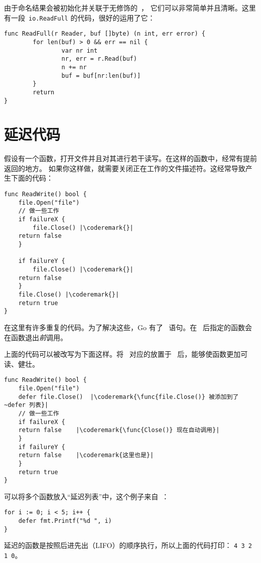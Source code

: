 由于命名结果会被初始化并关联于无修饰的~，
它们可以非常简单并且清晰。这里有一段~\lstinline{io.ReadFull} 的代码，很好的运用了它：

\begin{lstlisting}
func ReadFull(r Reader, buf []byte) (n int, err error) {
        for len(buf) > 0 && err == nil {
                var nr int
                nr, err = r.Read(buf)
                n += nr
                buf = buf[nr:len(buf)]
        }
        return
}
\end{lstlisting}

\section{延迟代码}
\label{sec:deferred code}
假设有一个函数，打开文件并且对其进行若干读写。在这样的函数中，经常有提前返回的地方。
如果你这样做，就需要关闭正在工作的文件描述符。这经常导致产生下面的代码：
\begin{lstlisting}[caption=没有 defer]
func ReadWrite() bool {
    file.Open("file")
    // 做一些工作
    if failureX {
        file.Close() |\coderemark{}|
	return false
    }

    if failureY {
        file.Close() |\coderemark{}|
	return false
    }
    file.Close() |\coderemark{}|
    return true
}
\end{lstlisting}
在这里有许多重复的代码。为了解决这些，Go 有了~ 
语句。在~ 后指定的函数会在函数退出\emph{前}调用。

上面的代码可以被改写为下面这样。将~ 对应的放置于~ 
后，能够使函数更加可读、健壮。
\begin{lstlisting}[caption=有 defer]
func ReadWrite() bool {
    file.Open("file")
    defer file.Close()	|\coderemark{\func{file.Close()} 被添加到了~defer 列表}|
    // 做一些工作
    if failureX {
	return false    |\coderemark{\func{Close()} 现在自动调用}|
    }
    if failureY {
	return false    |\coderemark{这里也是}|
    }
    return true
}
\end{lstlisting}

可以将多个函数放入``延迟列表''中，这个例子来自~\cite{effective_go}：
\begin{lstlisting}
for i := 0; i < 5; i++ { 
    defer fmt.Printf("%d ", i) 
} 
\end{lstlisting}
延迟的函数是按照后进先出（LIFO）的顺序执行，所以上面的代码打印：
\lstinline{4 3 2 1 0}。

